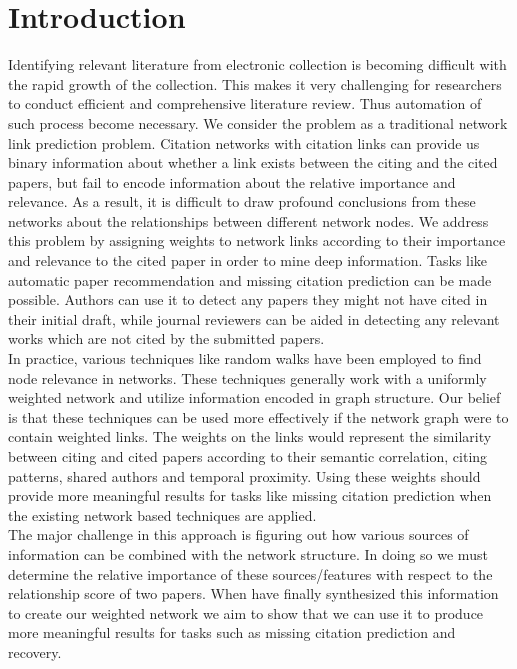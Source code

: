 \documentclass{article} %
\begin{document}
\section{Introduction}
	Identifying relevant literature from electronic collection is becoming difficult with the rapid growth of the collection. This makes it very challenging for researchers to conduct efficient and comprehensive literature review. Thus automation of such process become necessary. We consider the problem as a traditional network link prediction problem. Citation networks with citation links can provide us binary information about whether a link exists between the citing and the cited papers, but fail to encode information about the relative importance and relevance. As a result, it is difficult to draw profound conclusions from these networks about the relationships between different network nodes. We address this problem by assigning weights to network links according to their importance and relevance to the cited paper in order to mine deep information. Tasks like automatic paper recommendation and missing citation prediction can be made possible. Authors can use it to detect any papers they might not have cited in their initial draft, while journal reviewers can be aided in detecting any relevant works which are not cited by the submitted papers.\\
	In practice, various techniques like random walks \cite{Sarkar2009,Tong2006} have been employed to find node relevance in networks. These techniques generally work with a uniformly weighted network and utilize information encoded in graph structure. Our belief is that these techniques can be used more effectively if the network graph were to contain weighted links. The weights on the links would represent the similarity between citing and cited papers according to their semantic correlation, citing patterns, shared authors and temporal proximity. Using these weights should provide more meaningful results for tasks like missing citation prediction when the existing network based techniques are applied.\\
The major challenge in this approach is figuring out how various sources of information can be combined with the network structure. In doing so we must determine the relative importance of these sources/features with respect to the relationship score of two papers. When have finally synthesized this information to create our weighted network we aim to show that we can use it to produce more meaningful results for tasks such as missing citation prediction and recovery.
\end{document}
